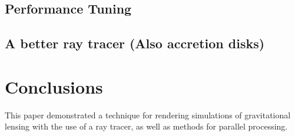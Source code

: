 \subsection {Performance Tuning}
\subsection {A better ray tracer (Also accretion disks)}


\section{Conclusions}
\label{sec:concl}

This paper demonstrated a technique for rendering simulations of gravitational lensing with the use of a ray tracer, as well as methods for parallel processing. %


